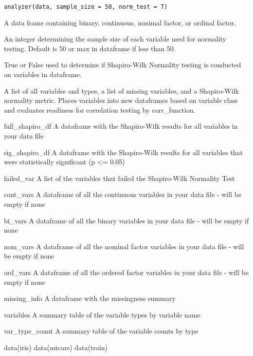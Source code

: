 \documentclass[a4paper]{book}
\begin{document}
%
\begin{Usage}
\begin{verbatim}
analyzer(data, sample_size = 50, norm_test = T)
\end{verbatim}
\end{Usage}
%
\begin{Arguments}
\begin{ldescription}
\item[\code{data}] A data frame containing binary, continuous, nonimal factor, or ordinal factor.

\item[\code{sample\_size}] An integer determining the sample size of each variable used for normality testing. Default is 50 or max in dataframe if less than 50.

\item[\code{norm\_test}] True or False used to determine if Shapiro-Wilk Normality testing is conducted on variables in dataframe.
\end{ldescription}
\end{Arguments}
%
\begin{Value}
A list of all variables and types, a list of missing variables, and a Shapiro-Wilk normality metric.
Places variables into new dataframes based on variable class and evaluates readiness for correlation testing
by corr\_function.

full\_shapiro\_df A dataframe with the Shapiro-Wilk results for all variables in your data file

sig\_shapiro\_df A dataframe with the Shapiro-Wilk results for all variables that were statistically significant (p <= 0.05)

failed\_var A list of the variables that failed the Shapiro-Wilk Normality Test

cont\_vars A dataframe of all the continuous variables in your data file - will be empty if none

bi\_vars A dataframe of all the binary variables in your data file - will be empty if none

nom\_vars A dataframe of all the nominal factor variables in your data file - will be empty if none

ord\_vars A dataframe of all the ordered factor variables in your data file - will be empty if none

missing\_info A dataframe with the missingness summary

variables A summary table of the variable types by variable name

var\_type\_count A summary table of the variable counts by type
\end{Value}
%
\begin{Examples}
\begin{ExampleCode}
data(iris)
data(mtcars)
data(train)

\end{ExampleCode}
\end{Examples}
\printindex{}
\end{document}
